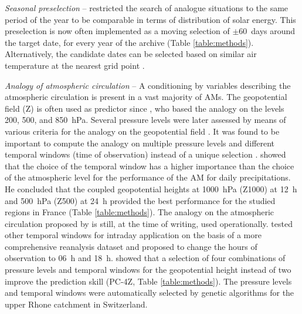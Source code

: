 \documentclass[review]{elsarticle}
\begin{document}
\textit{Seasonal preselection} -- \citet{Lorenz1969} restricted the search of analogue situations to the same period of the year to be comparable in terms of distribution of solar energy. This preselection is now often implemented as a moving selection of $\pm$60~days around the target date, for every year of the archive (Table \ref{table:methods}). Alternatively, the candidate dates can be selected based on similar air temperature at the nearest grid point \citep[Table \ref{table:methods}][]{BenDaoud2016}.

\textit{Analogy of atmospheric circulation} -- A conditioning by variables describing the atmospheric circulation is present in a vast majority of AMs. The geopotential field (Z) is often used as predictor since \citet{Lorenz1969}, who based the analogy on the levels 200, 500, and 850~hPa. Several pressure levels were later assessed by means of various criteria for the analogy on the geopotential field \citep{Duband1970, Duband1974, Duband1981, Guilbaud1997}. It was found to be important to compute the analogy on multiple pressure levels and different temporal windows (time of observation) instead of a unique selection \citep{Guilbaud1998, Obled2002}. \citet{Bontron2004} showed that the choice of the temporal window has a higher importance than the choice of the atmospheric level for the performance of the AM for daily precipitations. He concluded that the coupled geopotential heights at 1000~hPa (Z1000) at 12~h and 500~hPa (Z500) at 24~h provided the best performance \citep[for a subset of the NCEP/NCAR Reanalysis I;][]{Kalnay1996, Kistler2001} for the studied regions in France (Table \ref{table:methods}). The analogy on the atmospheric circulation proposed by \citet{Bontron2004} is still, at the time of writing, used operationally. \citet{Marty2010} tested other temporal windows for intraday application on the basis of a more comprehensive reanalysis dataset and proposed to change the hours of observation to 06~h and 18~h. \citet{Horton2018a} showed that a selection of four combinations of pressure levels and temporal windows for the geopotential height instead of two improve the prediction skill (PC-4Z, Table \ref{table:methods}). The pressure levels and temporal windows were automatically selected by genetic algorithms for the upper Rhone catchment in Switzerland.
\end{document}
